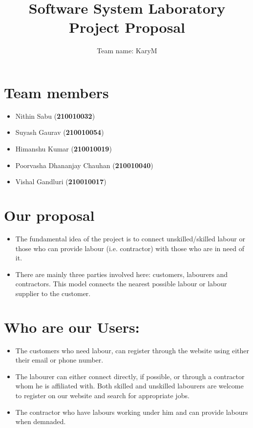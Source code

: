 \documentclass[12pt]{article}
\title{Software System Laboratory\\Project Proposal}
\author{Team name: \large KaryM}
\date{}
\begin{document}
\maketitle
\section*{Team members}
\begin{itemize}
\item Nithin Sabu (\textbf{210010032})
\item Suyash Gaurav (\textbf{210010054})
\item Himanshu Kumar (\textbf{210010019})
\item Poorvasha Dhananjay Chauhan (\textbf{210010040})
\item Vishal Gandluri (\textbf{210010017})
\end{itemize}
\section*{Our proposal}
\begin{itemize}
    \item The fundamental idea of the project is to connect unskilled/skilled labour or those who can provide labour (i.e. contractor) with those who are in need of it.
    \item There are mainly three parties involved here: customers, labourers and contractors. This model connects the nearest possible labour or labour supplier to the customer.
\end{itemize}
\section*{Who are our Users:}
\begin{itemize}
\item The customers who need labour, can register through the website using either their email or phone number.
\item The labourer can either connect directly, if possible, or through a contractor whom he is affiliated with. Both skilled and unskilled labourers are welcome to register on our website and search for appropriate jobs.
\item The contractor who have labours working under him and can provide labours when demnaded.
\end{itemize}
\end{document}
